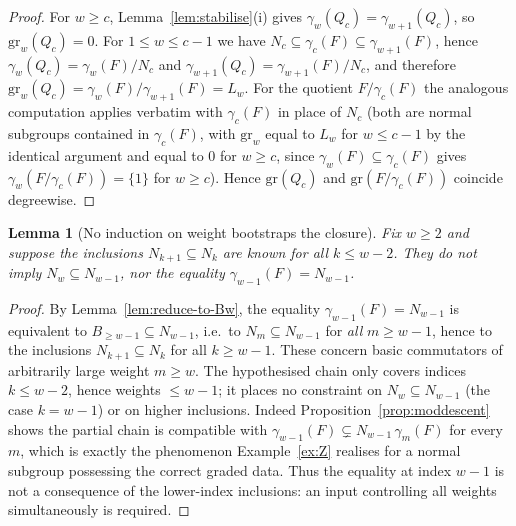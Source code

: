 \documentclass{amsart}
\newtheorem{lemma}{Lemma}
\theoremstyle{definition}
\theoremstyle{remark}
\begin{document}
\begin{proof}
For $w\ge c$, Lemma~\ref{lem:stabilise}(i) gives
$\gamma_w(Q_c)=\gamma_{w+1}(Q_c)$, so $\mathrm{gr}_w(Q_c)=0$. For $1\le w\le c-1$
we have $N_c\subseteq\gamma_c(F)\subseteq\gamma_{w+1}(F)$, hence
$\gamma_w(Q_c)=\gamma_w(F)/N_c$ and $\gamma_{w+1}(Q_c)=\gamma_{w+1}(F)/N_c$, and
therefore
$\mathrm{gr}_w(Q_c)=\gamma_w(F)/\gamma_{w+1}(F)=L_w$. For the quotient
$F/\gamma_c(F)$ the analogous computation applies verbatim with $\gamma_c(F)$ in
place of $N_c$ (both are normal subgroups contained in $\gamma_c(F)$, with
$\mathrm{gr}_w$ equal to $L_w$ for $w\le c-1$ by the identical argument and equal
to $0$ for $w\ge c$, since $\gamma_w(F)\subseteq\gamma_c(F)$ gives
$\gamma_w(F/\gamma_c(F))=\{1\}$ for $w\ge c$). Hence $\mathrm{gr}(Q_c)$ and
$\mathrm{gr}(F/\gamma_c(F))$ coincide degreewise.
\end{proof}

\begin{lemma}[No induction on weight bootstraps the closure]\label{lem:noind}
Fix $w\ge2$ and suppose the inclusions $N_{k+1}\subseteq N_k$ are known for all
$k\le w-2$. They do not imply $N_w\subseteq N_{w-1}$, nor the equality
$\gamma_{w-1}(F)=N_{w-1}$.
\end{lemma}

\begin{proof}
By Lemma~\ref{lem:reduce-to-Bw}, the equality $\gamma_{w-1}(F)=N_{w-1}$ is
equivalent to $B_{\ge w-1}\subseteq N_{w-1}$, i.e.\ to $N_m\subseteq N_{w-1}$ for
\emph{all} $m\ge w-1$, hence to the inclusions $N_{k+1}\subseteq N_k$ for all
$k\ge w-1$. These concern basic commutators of arbitrarily large weight
$m\ge w$. The hypothesised chain only covers indices $k\le w-2$, hence weights
$\le w-1$; it places no constraint on $N_w\subseteq N_{w-1}$ (the case $k=w-1$) or
on higher inclusions. Indeed Proposition~\ref{prop:moddescent} shows the partial
chain is compatible with $\gamma_{w-1}(F)\subsetneq N_{w-1}\,\gamma_m(F)$ for every
$m$, which is exactly the phenomenon Example~\ref{ex:Z} realises for a normal
subgroup possessing the correct graded data. Thus the equality at index $w-1$ is
not a consequence of the lower-index inclusions: an input controlling all weights
simultaneously is required.
\end{proof}
\end{document}
